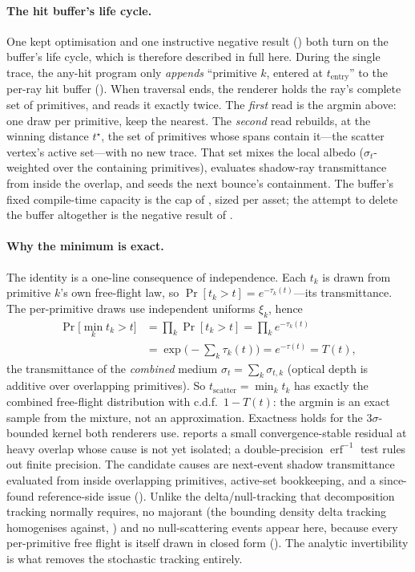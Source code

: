 \paragraph{The hit buffer's life cycle.} One kept optimisation and one instructive negative
result () both turn on the buffer's life cycle, which is therefore described in full here.
During the single trace, the any-hit program only \emph{appends} ``primitive
$k$, entered at $t_{\text{entry}}$'' to the per-ray hit buffer (). When
traversal ends, the renderer holds the ray's complete set of primitives, and reads it exactly
twice. The \emph{first} read is the argmin above: one draw per primitive, keep the nearest. The
\emph{second} read rebuilds, at the winning distance $t^\star$, the set of primitives whose spans
contain it---the scatter vertex's active set---with no new trace. That set mixes the local albedo
($\sigma_t$-weighted over the containing primitives), evaluates shadow-ray transmittance from
inside the overlap, and seeds the next bounce's containment. The buffer's fixed compile-time capacity
is the cap of , sized per asset; the attempt to delete the buffer altogether is
the negative result of .

\paragraph{Why the minimum is exact.} The identity is a one-line consequence of independence. Each $t_k$
is drawn from primitive $k$'s own free-flight law, so $\Pr[t_k > t] = e^{-\tau_k(t)}$---its
transmittance. The per-primitive draws use independent uniforms $\xi_k$, hence
\[
\begin{aligned}
  \Pr\!\big[\min_k t_k > t\big]
  &= \prod_k \Pr[t_k > t] = \prod_k e^{-\tau_k(t)} \\
  &= \exp\!\Big(-\!\sum_k \tau_k(t)\Big) = e^{-\tau(t)} = T(t),
\end{aligned}
\]
the transmittance of the \emph{combined} medium $\sigma_t=\sum_k\sigma_{t,k}$ (optical depth is additive
over overlapping primitives). So $t_{\text{scatter}}=\min_k t_k$ has exactly the combined free-flight
distribution with c.d.f.\ $1-T(t)$: the argmin is an exact sample from the mixture, not an
approximation. Exactness holds for the $3\sigma$-bounded kernel both renderers use.
 reports a small convergence-stable residual at heavy overlap whose cause is
not yet isolated; a double-precision $\operatorname{erf}^{-1}$ test rules out finite precision. The
candidate causes are next-event shadow transmittance evaluated from inside overlapping primitives,
active-set bookkeeping, and a since-found reference-side issue (). Unlike the
delta/null-tracking that decomposition tracking normally requires, no majorant (the
bounding density delta tracking homogenises against, )
and no null-scattering events appear here, because every per-primitive free flight is itself drawn in
closed form (). The analytic invertibility is what removes the stochastic
tracking entirely.

